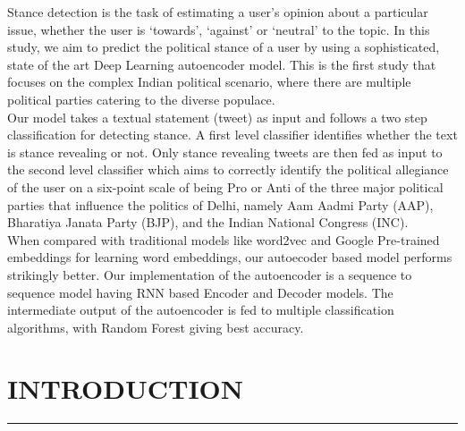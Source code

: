 \documentclass[a4paper,11pt]{article}
\begin{document}

Stance detection is the task of estimating a user's opinion about a particular issue, whether the user is `towards', `against' or `neutral' to the topic. In this study, we aim to predict the political stance of a user by using a sophisticated, state of the art Deep Learning autoencoder model. This is the first study that focuses on the complex Indian political scenario, where there are multiple political parties catering to the diverse populace.\medskip\\ 
Our model takes a textual statement (tweet) as input and follows a two step classification for detecting stance. A first level classifier identifies whether the text is stance revealing or not. Only stance revealing tweets are then fed as input to the second level classifier which aims to correctly identify the political allegiance of the user on a six-point scale of being Pro or Anti of the three major political parties that influence the politics of Delhi, namely Aam Aadmi Party (AAP), Bharatiya Janata Party (BJP), and the Indian National Congress (INC).\medskip\\
When compared with traditional models like word2vec and Google Pre-trained embeddings for learning word embeddings, our autoecoder based model performs strikingly better. Our implementation of the autoencoder is a sequence to sequence model having RNN based Encoder and Decoder models. The intermediate output of the autoencoder is fed to multiple classification algorithms, with Random Forest giving best accuracy.

\newpage
\tableofcontents
\newpage

\listoffigures
{} 
\listoftables
{}

\newpage
{}
\setcounter{page}{7}
\section{INTRODUCTION}
\hrule
\vspace*{5mm}
\end{document}
